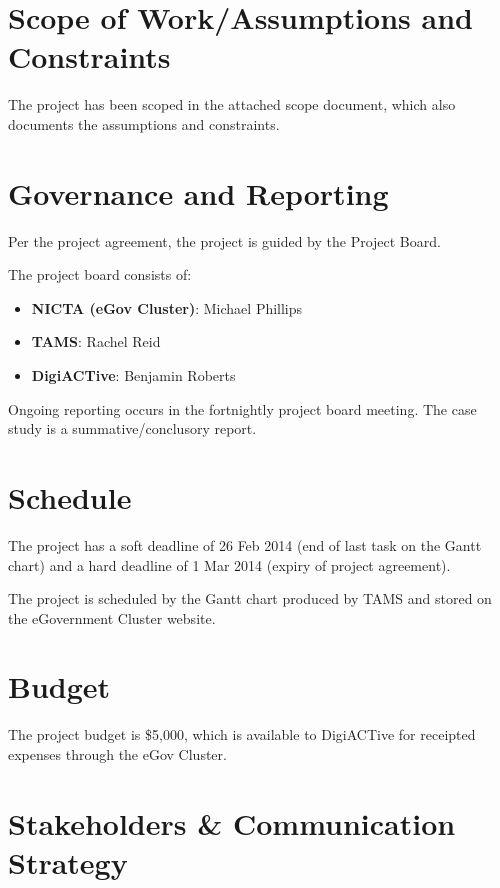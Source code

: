 \documentclass[12pt,a4paper,twosided]{article}
\begin{document}
\section{Scope of Work/Assumptions and
Constraints}\label{scope-of-workassumptions-and-constraints}

The project has been scoped in the attached scope document, which also
documents the assumptions and constraints.

\section{Governance and Reporting}\label{governance-and-reporting}

Per the project agreement, the project is guided by the Project Board.

The project board consists of:

\begin{itemize}
\itemsep1pt\parskip0pt
\item
  \textbf{NICTA (eGov Cluster)}: Michael Phillips
\item
  \textbf{TAMS}: Rachel Reid
\item
  \textbf{DigiACTive}: Benjamin Roberts
\end{itemize}

Ongoing reporting occurs in the fortnightly project board meeting. The
case study is a summative/conclusory report.

\section{Schedule}\label{schedule}

The project has a soft deadline of 26 Feb 2014 (end of last task on the
Gantt chart) and a hard deadline of 1 Mar 2014 (expiry of project
agreement).

The project is scheduled by the Gantt chart produced by TAMS and stored
on the eGovernment Cluster website.

\section{Budget}\label{budget}

The project budget is \$5,000, which is available to DigiACTive for
receipted expenses through the eGov Cluster.

\section{Stakeholders \& Communication
Strategy}\label{stakeholders-communication-strategy}
\end{document}
